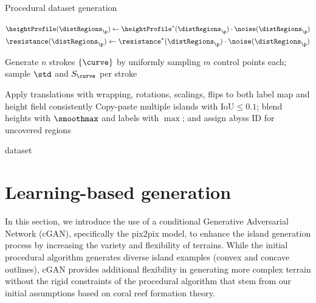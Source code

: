 \begin{algorithm}[H]
    \caption{Procedural dataset generation}
    \label{alg:dataset-generation}
    \DontPrintSemicolon

    \BlankLine
    $\heightProfile(\distRegions_\p) \gets \heightProfile^*(\distRegions_\p)\cdot \noise(\distRegions_\p)$\;
    $\resistance(\distRegions_\p) \gets \resistance^*(\distRegions_\p)\cdot \noise(\distRegions_\p)$\;

    Generate $n$ strokes $\{\curve\}$ by uniformly sampling $m$ control points each; sample $\std$ and $S_\curve$ per stroke\;


    Apply translations with wrapping, rotations, scalings, flips to both label map and height field consistently\;
    Copy-paste multiple islands with IoU$\le 0.1$; blend heights with $\smoothmax$ and labels with $\max$; and assign abyss ID for uncovered regions\;

    \Return dataset
\end{algorithm}

\section{Learning-based generation}
\label{sec:coral-island-cGAN-training}

In this section, we introduce the use of a conditional Generative Adversarial Network (cGAN), specifically the pix2pix model, to enhance the island generation process by increasing the variety and flexibility of terrains. While the initial procedural algorithm generates diverse island examples (convex and concave outlines), cGAN provides additional flexibility in generating more complex terrain without the rigid constraints of the procedural algorithm that stem from our initial assumptions based on coral reef formation theory.

